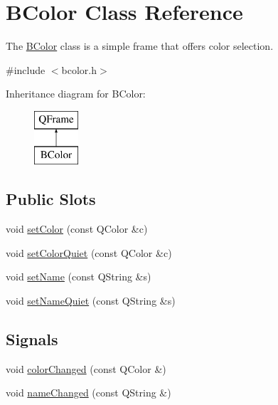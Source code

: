\hypertarget{class_b_color}{}\section{B\+Color Class Reference}
\label{class_b_color}


The \hyperlink{class_b_color}{B\+Color} class is a simple frame that offers color selection.  




{\ttfamily \#include $<$bcolor.\+h$>$}

Inheritance diagram for B\+Color\+:\begin{figure}[H]
\begin{center}
\leavevmode
\includegraphics[height=2.000000cm]{class_b_color}
\end{center}
\end{figure}
\subsection*{Public Slots}
\begin{DoxyCompactItemize}
\item 
void \hyperlink{class_b_color_a901e6704aef22f6db97d3578e14777c6}{set\+Color} (const Q\+Color \&c)
\item 
void \hyperlink{class_b_color_a3781c2b986f19ceaac7c994767015b56}{set\+Color\+Quiet} (const Q\+Color \&c)
\item 
void \hyperlink{class_b_color_abcf2d57696ada6466424663f15624cad}{set\+Name} (const Q\+String \&s)
\item 
void \hyperlink{class_b_color_ac159569b670ed175be068204a28a7be9}{set\+Name\+Quiet} (const Q\+String \&s)
\end{DoxyCompactItemize}
\subsection*{Signals}
\begin{DoxyCompactItemize}
\item 
void \hyperlink{class_b_color_a75ac94fde91e10eb6c27242f608b8d62}{color\+Changed} (const Q\+Color \&)
\item 
void \hyperlink{class_b_color_a5895b999f69044b919e6d5526577ad87}{name\+Changed} (const Q\+String \&)
\end{DoxyCompactItemize}
